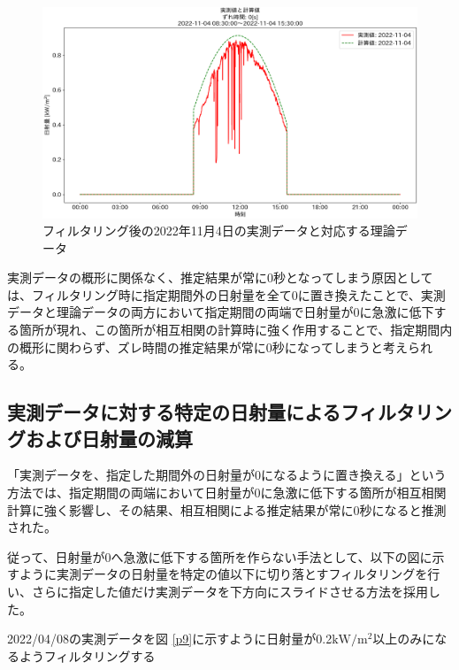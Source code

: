 \documentclass[a4j,12pt,]{jarticle}
\begin{document}
\begin{figure}[H]
  \begin{center}
    \includegraphics[width=160mm]{2022-11-04_partial_corr.png}
    \caption{フィルタリング後の2022年11月4日の実測データと対応する理論データ}
    \label{p7}
  \end{center}
\end{figure}

実測データの概形に関係なく、推定結果が常に0秒となってしまう原因としては、フィルタリング時に指定期間外の日射量を全て0に置き換えたことで、実測データと理論データの両方において指定期間の両端で日射量が0に急激に低下する箇所が現れ、この箇所が相互相関の計算時に強く作用することで、指定期間内の概形に関わらず、ズレ時間の推定結果が常に0秒になってしまうと考えられる。

\subsection{実測データに対する特定の日射量によるフィルタリングおよび日射量の減算}
「実測データを、指定した期間外の日射量が0になるように置き換える」という方法では、指定期間の両端において日射量が0に急激に低下する箇所が相互相関計算に強く影響し、その結果、相互相関による推定結果が常に0秒になると推測された。

従って、日射量が0へ急激に低下する箇所を作らない手法として、以下の図に示すように実測データの日射量を特定の値以下に切り落とすフィルタリングを行い、さらに指定した値だけ実測データを下方向にスライドさせる方法を採用した。

2022/04/08の実測データを図 \ref{p9}に示すように日射量が0.2$\mathrm{kW}/\mathrm{m}^2$以上のみになるようフィルタリングする
\end{document}
